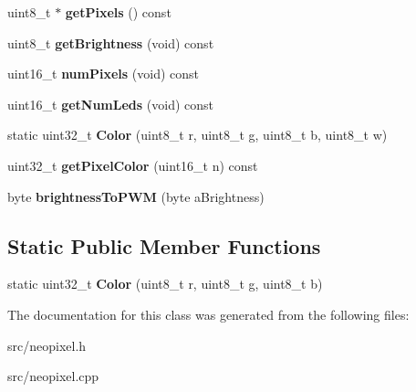 \begin{DoxyCompactItemize}
uint8\+\_\+t $\ast$ {\bfseries get\+Pixels} () const
\item 
\mbox{\label{classAdafruit__NeoPixel_ab1b7af02712d6a1e228783a89ec12832}} 
uint8\+\_\+t {\bfseries get\+Brightness} (void) const
\item 
\mbox{\label{classAdafruit__NeoPixel_a515921e2c768750698f199c27613a143}} 
uint16\+\_\+t {\bfseries num\+Pixels} (void) const
\item 
\mbox{\label{classAdafruit__NeoPixel_ae4473aa9356f75476366467be4c8157a}} 
uint16\+\_\+t {\bfseries get\+Num\+Leds} (void) const
\item 
\mbox{\label{classAdafruit__NeoPixel_a5d8696db629461046c05aaaff6c576b0}} 
static uint32\+\_\+t {\bfseries Color} (uint8\+\_\+t r, uint8\+\_\+t g, uint8\+\_\+t b, uint8\+\_\+t w)
\item 
\mbox{\label{classAdafruit__NeoPixel_abccaba27e35bfae27c856e76b46c7924}} 
uint32\+\_\+t {\bfseries get\+Pixel\+Color} (uint16\+\_\+t n) const
\item 
\mbox{\label{classAdafruit__NeoPixel_afb1a8ba8d09e65b18550c8e4f911ac0a}} 
byte {\bfseries brightness\+To\+P\+WM} (byte a\+Brightness)
\end{DoxyCompactItemize}
\subsection*{Static Public Member Functions}
\begin{DoxyCompactItemize}
\item 
\mbox{\label{classAdafruit__NeoPixel_ac49f3c50948815d45cecccbc66453386}} 
static uint32\+\_\+t {\bfseries Color} (uint8\+\_\+t r, uint8\+\_\+t g, uint8\+\_\+t b)
\end{DoxyCompactItemize}


The documentation for this class was generated from the following files\+:\begin{DoxyCompactItemize}
\item 
src/neopixel.\+h\item 
src/neopixel.\+cpp\end{DoxyCompactItemize}
